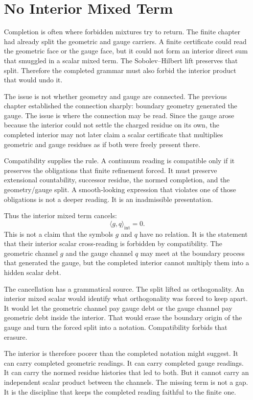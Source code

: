 \section{No Interior Mixed Term}

Completion is often where forbidden mixtures try to return. The finite
chapter had already split the geometric and gauge carriers. A finite
certificate could read the geometric face or the gauge face, but it could
not form an interior direct sum that smuggled in a scalar mixed term. The
Sobolev--Hilbert lift preserves that split. Therefore the completed grammar
must also forbid the interior product that would undo it.

The issue is not whether geometry and gauge are connected. The previous
chapter established the connection sharply: boundary geometry generated the
gauge. The issue is where the connection may be read. Since the gauge arose
because the interior could not settle the charged residue on its own, the
completed interior may not later claim a scalar certificate that multiplies
geometric and gauge residues as if both were freely present there.

Compatibility supplies the rule. A continuum reading is compatible only if
it preserves the obligations that finite refinement forced. It must preserve
extensional countability, successor residue, the normed completion, and the
geometry/gauge split. A smooth-looking expression that violates one of those
obligations is not a deeper reading. It is an inadmissible presentation.

Thus the interior mixed term cancels:
\[
  \langle g,q\rangle_{\mathrm{int}} = 0 .
\]
This is not a claim that the symbols \(g\) and \(q\) have no relation. It is
the statement that their interior scalar cross-reading is forbidden by
compatibility. The geometric channel \(g\) and the gauge channel \(q\) may
meet at the boundary process that generated the gauge, but the completed
interior cannot multiply them into a hidden scalar debt.

The cancellation has a grammatical source. The split lifted as
orthogonality. An interior mixed scalar would identify what orthogonality was
forced to keep apart. It would let the geometric channel pay gauge debt or
the gauge channel pay geometric debt inside the interior. That would erase
the boundary origin of the gauge and turn the forced split into a notation.
Compatibility forbids that erasure.

The interior is therefore poorer than the completed notation might suggest.
It can carry completed geometric readings. It can carry completed gauge
readings. It can carry the normed residue histories that led to both. But it
cannot carry an independent scalar product between the channels. The missing
term is not a gap. It is the discipline that keeps the completed reading
faithful to the finite one.

